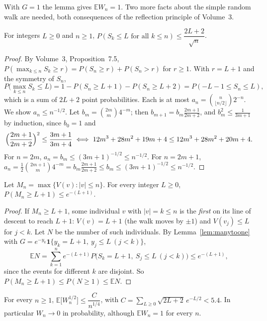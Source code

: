 With $G=1$ the lemma gives $\mathbb EW_n=1$. Two more facts about the simple random walk are needed, both consequences of the reflection principle of Volume~3.

\begin{lemma}\label{lem:ballotbound}
For integers $L\ge0$ and $n\ge1$, $P(S_k\le L\text{ for all }k\le n)\le\dfrac{2L+2}{\sqrt n}$.
\end{lemma}

\begin{proof}
By Volume~3, Proposition~7.5, $P(\max_{k\le n}S_k\ge r)=P(S_n\ge r)+P(S_n>r)$ for $r\ge1$. With $r=L+1$ and the symmetry of $S_n$,
\[
P\bigl(\max_{k\le n}S_k\le L\bigr)=1-P(S_n\ge L+1)-P(S_n\ge L+2)=P(-L-1\le S_n\le L),
\]
which is a sum of $2L+2$ point probabilities. Each is at most $a_n=\binom n{\lfloor n/2\rfloor}2^{-n}$. We show $a_n\le n^{-1/2}$. Let $b_m=\binom{2m}m4^{-m}$; then $b_{m+1}=b_m\frac{2m+1}{2m+2}$, and $b_m^2\le\frac1{3m+1}$ by induction, since $b_0=1$ and
\[
\Bigl(\frac{2m+1}{2m+2}\Bigr)^2\le\frac{3m+1}{3m+4}\iff12m^3+28m^2+19m+4\le12m^3+28m^2+20m+4.
\]
For $n=2m$, $a_n=b_m\le(3m+1)^{-1/2}\le n^{-1/2}$. For $n=2m+1$, $a_n=\frac12\binom{2m+1}m4^{-m}=b_m\frac{2m+1}{2m+2}\le b_m\le(3m+1)^{-1/2}\le n^{-1/2}$.
\end{proof}

\begin{lemma}\label{lem:nohigh}
Let $M_n=\max\{V(v):|v|\le n\}$. For every integer $L\ge0$, $P(M_n\ge L+1)\le e^{-(L+1)}$.
\end{lemma}

\begin{proof}
If $M_n\ge L+1$, some individual $v$ with $|v|=k\le n$ is the \emph{first} on its line of descent to reach $L+1$: $V(v)=L+1$ (the walk moves by $\pm1$) and $V(v_j)\le L$ for $j<k$. Let $N$ be the number of such individuals. By Lemma~\ref{lem:manytoone} with $G=e^{-y_k}\mathbf 1\{y_k=L+1,\ y_j\le L\ (j<k)\}$,
\[
\mathbb EN=\sum_{k=1}^n e^{-(L+1)}P\bigl(S_k=L+1,\ S_j\le L\ (j<k)\bigr)\le e^{-(L+1)},
\]
since the events for different $k$ are disjoint. So $P(M_n\ge L+1)\le P(N\ge1)\le\mathbb EN$.
\end{proof}

\begin{theorem}\label{thm:halfmoment}
For every $n\ge1$, $\mathbb E\bigl[W_n^{1/2}\bigr]\le\dfrac{C}{n^{1/4}}$, with $C=\sum_{L\ge0}\sqrt{2L+2}\,e^{-L/2}<5.4$. In particular $W_n\to0$ in probability, although $\mathbb EW_n=1$ for every $n$.
\end{theorem}

